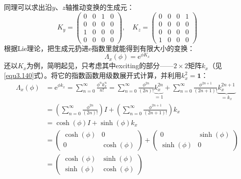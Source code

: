 同理可以求出沿$y$、$z$轴推动变换的生成元：
\begin{equation}
\label{equ3.142}
	K_y =
		\begin{pmatrix}
			0 & 0 & 1 & 0 \\
			0 & 0 & 0 & 0 \\
			1 & 0 & 0 & 0 \\
			0 & 0 & 0 & 0
		\end{pmatrix}
	, \quad
	K_z =
		\begin{pmatrix}
			0 & 0 & 0 & 1 \\
			0 & 0 & 0 & 0 \\
			0 & 0 & 0 & 0 \\
			1 & 0 & 0 & 0
		\end{pmatrix}
\end{equation}
根据Lie理论，把生成元扔进$\mathrm{e}$指数里就能得到有限大小的变换：
\[
	\Lambda_x(\phi) = \mathrm{e}^{\phi K_x}
\]
还以$K_x$为例，简明起见，只考虑其中exciting的部分——$2 \times 2$矩阵$k_x$（见\eqref{equ3.140}式）。将它的指数函数用级数展开式计算，并利用$k_x^2 = \mathbf{1}$：
\begin{align}
	\Lambda_x(\phi) &= \mathrm{e}^{\phi k_x} = \sum_{n = 0}^{\infty} \frac{\phi^n k_x^n}{n!} = \sum_{n = 0}^{\infty} \frac{\phi^{2n}}{(2n)!} \underbrace{k_x^{2n}}_{=1} + \sum_{n = 0}^{\infty} \frac{\phi^{2n + 1}}{(2n + 1)!} \underbrace{k_x^{2n + 1}}_{=k_x} \nonumber \\
	&= \left( \sum_{n = 0}^{\infty} \frac{\phi^{2n}}{(2n)!} \right) I + \left( \sum_{n = 0}^{\infty} \frac{\phi^{2n + 1}}{(2n + 1)!} \right) k_x \nonumber \\
	&= \cosh(\phi) I + \sinh(\phi) k_x \nonumber \\
	\label{equ3.143}
	&=
		\begin{pmatrix}
			\cosh(\phi) & 0 \\
			0 & \cosh(\phi)
		\end{pmatrix}
	+
		\begin{pmatrix}
			0 & \sinh(\phi) \\
			\sinh(\phi) & 0
		\end{pmatrix} \nonumber \\
	&=
		\begin{pmatrix}
			\cosh(\phi) & \sinh(\phi) \\
			\sinh(\phi) & \cosh(\phi)
		\end{pmatrix}
\end{align}
